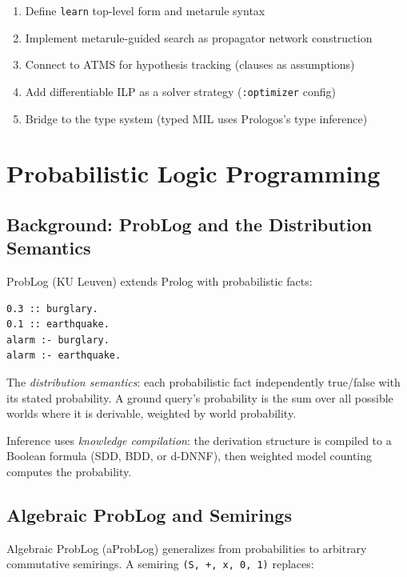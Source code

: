 \documentclass[11pt]{article}
\begin{document}
\begin{enumerate}
\item Define \texttt{learn} top-level form and metarule syntax
\item Implement metarule-guided search as propagator network construction
\item Connect to ATMS for hypothesis tracking (clauses as assumptions)
\item Add differentiable ILP as a solver strategy (\texttt{:optimizer} config)
\item Bridge to the type system (typed MIL uses Prologos's type inference)
\end{enumerate}
\section{Probabilistic Logic Programming}
\label{sec:org77a6f8c}

\subsection{Background: ProbLog and the Distribution Semantics}
\label{sec:org3ef8905}

ProbLog (KU Leuven) extends Prolog with probabilistic facts:

\begin{verbatim}
0.3 :: burglary.
0.1 :: earthquake.
alarm :- burglary.
alarm :- earthquake.
\end{verbatim}

The \emph{distribution semantics}: each probabilistic fact independently true/false
with its stated probability. A ground query's probability is the sum over all
possible worlds where it is derivable, weighted by world probability.

Inference uses \emph{knowledge compilation}: the derivation structure is compiled to
a Boolean formula (SDD, BDD, or d-DNNF), then weighted model counting computes
the probability.
\subsection{Algebraic ProbLog and Semirings}
\label{sec:orgc61edfb}

Algebraic ProbLog (aProbLog) generalizes from probabilities to arbitrary
commutative semirings. A semiring \texttt{(S, +, x, 0, 1)} replaces:
\end{document}
